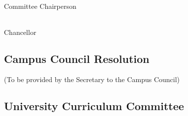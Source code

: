 \documentclass[11pt,a4paper]{article}
\begin{document}
\vspace{1cm}
\begin{center}
{\bf {}}\\
Committee Chairperson
\end{center}

\vspace{1cm}
\begin{center}
{\bf {}}\\
Chancellor
\end{center}

\newpage
\thispagestyle{empty}
\subsection*{Campus Council Resolution}

(To be provided by the Secretary to the Campus Council)

\newpage
\thispagestyle{empty}
\subsection*{University Curriculum Committee}
\end{document}
